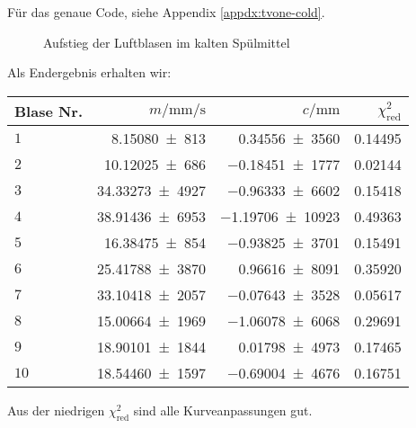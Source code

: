		Für das genaue \gnuplot{} Code, siehe Appendix \ref{appdx:tvone-cold}. 
		\begin{figure}[H]
			\centering
			\captionsetup{width=0.8\textwidth, justification=centering}
			\resizebox{\linewidth}{!}{}
			\caption{Aufstieg der Luftblasen im kalten Spülmittel }
			\vspace{-1em}
		\end{figure}
		\newpage
		Als Endergebnis erhalten wir:
		\begin{center}
			\begin{tabular}{lrrr}
				\toprule
				Blase Nr. & $m/\si{\milli\meter\per\second}$ & $c/\si{\milli\meter}$ & $\chi^2_\text{red}$ \\
				\midrule
					$1$ & \num{8,15080(813)} & \num{0,34556(3560)} & \num{0,14495} \\
					$2$ & \num{10,12025(686)} & \num{-0,18451(1777)} & \num{0,02144} \\
					$3$ & \num{34,33273(4927)} & \num{-0,96333(6602)} & \num{0,15418} \\
					$4$ & \num{38,91436(6953)} & \num{-1,19706(10923)} & \num{0,49363} \\
					$5$ & \num{16,38475(854)} & \num{-0,93825(3701)} & \num{0,15491} \\
					$6$ & \num{25,41788(3870)} & \num{0,96616(8091)} & \num{0,35920} \\
					$7$ & \num{33,10418(2057)} & \num{-0,07643(3528)} & \num{0,05617} \\
					$8$ & \num{15,00664(1969)} & \num{-1,06078(6068)} & \num{0,29691} \\
					$9$ & \num{18,90101(1844)} & \num{0,01798(4973)} & \num{0,17465} \\
					$10$ & \num{18,54460(1597)} & \num{-0,69004(4676)} & \num{0,16751} \\
				\bottomrule
			\end{tabular}
		\end{center}
		Aus der niedrigen $\chi^2_\text{red}$ sind alle Kurveanpassungen gut. 


